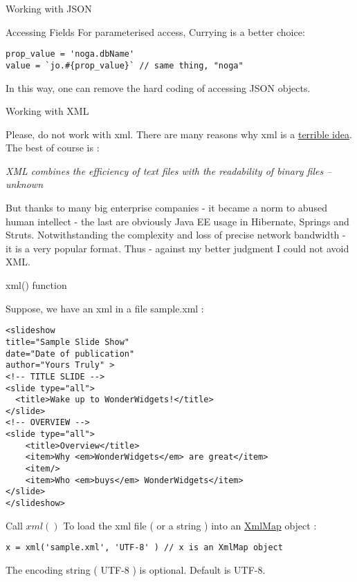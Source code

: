 \begin{section}{Working with JSON}
\begin{subsection}{Accessing Fields}
For parameterised access, Currying is a better choice:

\begin{lstlisting}[style=JexlStyle]
prop_value = 'noga.dbName'  
value = `jo.#{prop_value}` // same thing, "noga"
\end{lstlisting}
In this way, one can remove the hard coding of accessing JSON objects.
\end{subsection}

\end{section}

\begin{section}{Working with XML}

Please, do not work with xml. 
There are many reasons why xml is a \href{http://harmful.cat-v.org/software/xml}{terrible idea}.
The best of course is :
\begin{center}
\emph{
XML combines the efficiency of text files with the readability of binary files
 -- unknown
 }
\end{center}

But thanks to many big enterprise companies - it became a norm to abused human intellect - the last are obviously Java EE usage in Hibernate, Springs and Struts. Notwithstanding the complexity and loss of precise network bandwidth - it is a very popular format. 
Thus - against my better judgment I could not avoid XML.

\begin{subsection}{xml() function}

Suppose, we have an xml in a file sample.xml :
\begin{lstlisting}[style=xmlStyle]
<slideshow 
title="Sample Slide Show"
date="Date of publication"
author="Yours Truly" >
<!-- TITLE SLIDE -->
<slide type="all">
  <title>Wake up to WonderWidgets!</title>
</slide>
<!-- OVERVIEW -->
<slide type="all">
    <title>Overview</title>
    <item>Why <em>WonderWidgets</em> are great</item>
    <item/>
    <item>Who <em>buys</em> WonderWidgets</item>
</slide>
</slideshow>
\end{lstlisting}
Call $xml()$ To load the xml file ( or a string ) into an 
\href{https://github.com/nmondal/njexl/blob/master/lang/src/main/java/com/noga/njexl/lang/extension/dataaccess/XmlMap.java}{XmlMap} object :
\begin{lstlisting}[style=JexlStyle]
x = xml('sample.xml', 'UTF-8' ) // x is an XmlMap object
\end{lstlisting}
The encoding string ( UTF-8 ) is optional. 
Default is UTF-8. 


\end{subsection}
\end{section}
